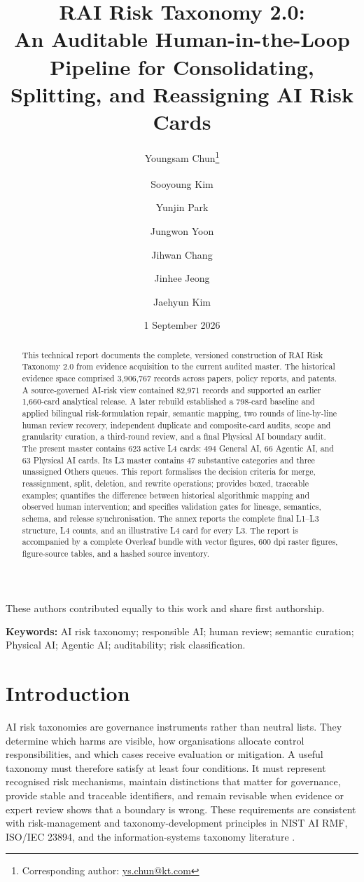 \documentclass[10pt,a4paper]{article}
\title{\bfseries RAI Risk Taxonomy 2.0:\\An Auditable Human-in-the-Loop Pipeline for Consolidating, Splitting, and Reassigning AI Risk Cards}
\author[1]{Youngsam Chun\textsuperscript{\textdagger}\thanks{Corresponding author: \href{mailto:ys.chun@kt.com}{ys.chun@kt.com}}}
\author[1]{Sooyoung Kim\textsuperscript{\textdagger}}
\author[1]{Yunjin Park}
\author[1]{Jungwon Yoon}
\author{Jihwan Chang}
\author[1]{Jinhee Jeong}
\author[1]{Jaehyun Kim}
\affil[1]{Responsible AI Department, Frontier AI Lab, KT Corporation, Seoul, Republic of Korea}
\date{1 September 2026}
\begin{document}
\maketitle
\begin{center}
\small\textsuperscript{\textdagger}These authors contributed equally to this work and share first authorship.
\end{center}

\begin{abstract}
This technical report documents the complete, versioned construction of RAI Risk Taxonomy 2.0 from evidence acquisition to the current audited master. The historical evidence space comprised 3,906,767 records across papers, policy reports, and patents. A source-governed AI-risk view contained 82,971 records and supported an earlier 1,660-card analytical release. A later rebuild established a 798-card baseline and applied bilingual risk-formulation repair, semantic mapping, two rounds of line-by-line human review recovery, independent duplicate and composite-card audits, scope and granularity curation, a third-round review, and a final Physical AI boundary audit. The present master contains 623 active L4 cards: 494 General AI, 66 Agentic AI, and 63 Physical AI cards. Its L3 master contains 47 substantive categories and three unassigned Others queues. This report formalises the decision criteria for merge, reassignment, split, deletion, and rewrite operations; provides boxed, traceable examples; quantifies the difference between historical algorithmic mapping and observed human intervention; and specifies validation gates for lineage, semantics, schema, and release synchronisation. The annex reports the complete final L1--L3 structure, L4 counts, and an illustrative L4 card for every L3. The report is accompanied by a complete Overleaf bundle with vector figures, 600 dpi raster figures, figure-source tables, and a hashed source inventory.
\end{abstract}

\noindent\textbf{Keywords:} AI risk taxonomy; responsible AI; human review; semantic curation; Physical AI; Agentic AI; auditability; risk classification.

\section{Introduction}

AI risk taxonomies are governance instruments rather than neutral lists. They determine which harms are visible, how organisations allocate control responsibilities, and which cases receive evaluation or mitigation. A useful taxonomy must therefore satisfy at least four conditions. It must represent recognised risk mechanisms, maintain distinctions that matter for governance, provide stable and traceable identifiers, and remain revisable when evidence or expert review shows that a boundary is wrong. These requirements are consistent with risk-management and taxonomy-development principles in NIST AI RMF, ISO/IEC 23894, and the information-systems taxonomy literature \citep{nist2023,iso23894,nickerson2013}.
\end{document}
